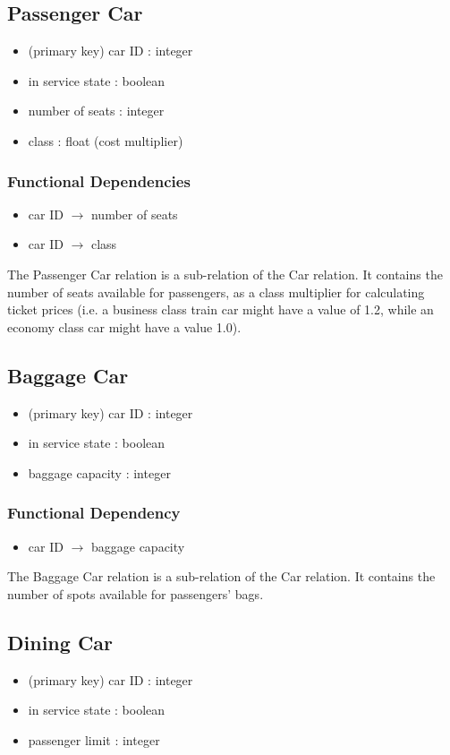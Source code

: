 \documentclass[a4paper]{article}
\begin{document}
\subsection*{Passenger Car}
\begin{itemize}
\item (primary key) car ID : integer
\item in service state : boolean
\item number of seats : integer
\item class : float (cost multiplier)
\end{itemize}
\subsubsection*{Functional Dependencies}
\begin{itemize}
\item car ID $\rightarrow$ number of seats
\item car ID $\rightarrow$ class
\end{itemize}
The Passenger Car relation is a sub-relation of the Car relation. It contains the number of seats available for passengers, as a class multiplier for calculating ticket prices (i.e. a business class train car might have a value of 1.2, while an economy class car might have a value 1.0).

\subsection*{Baggage Car}
\begin{itemize}
\item (primary key) car ID : integer
\item in service state : boolean
\item baggage capacity  : integer
\end{itemize}
\subsubsection*{Functional Dependency}
\begin{itemize}
\item car ID $\rightarrow$ baggage capacity
\end{itemize}
The Baggage Car relation is a sub-relation of the Car relation. It contains the number of spots available for passengers' bags.

\subsection*{Dining Car}
\begin{itemize}
\item (primary key) car ID : integer
\item in service state : boolean
\item passenger limit : integer
\end{itemize}
\end{document}
